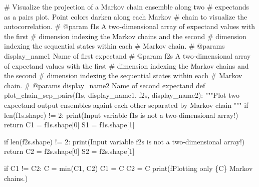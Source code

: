 \documentclass[
  letterpaper,
  DIV=11,
  numbers=noendperiod]{scrartcl}
\newenvironment{Shaded}{\begin{snugshade}}{\end{snugshade}}
\newcommand{\BuiltInTok}[1]{\textcolor[rgb]{0.00,0.23,0.31}{#1}}
\newcommand{\CommentTok}[1]{\textcolor[rgb]{0.37,0.37,0.37}{#1}}
\newcommand{\ControlFlowTok}[1]{\textcolor[rgb]{0.00,0.23,0.31}{#1}}
\newcommand{\DecValTok}[1]{\textcolor[rgb]{0.68,0.00,0.00}{#1}}
\newcommand{\KeywordTok}[1]{\textcolor[rgb]{0.00,0.23,0.31}{#1}}
\newcommand{\NormalTok}[1]{\textcolor[rgb]{0.00,0.23,0.31}{#1}}
\newcommand{\OperatorTok}[1]{\textcolor[rgb]{0.37,0.37,0.37}{#1}}
\newcommand{\SpecialCharTok}[1]{\textcolor[rgb]{0.37,0.37,0.37}{#1}}
\newcommand{\SpecialStringTok}[1]{\textcolor[rgb]{0.13,0.47,0.30}{#1}}
\newcommand{\StringTok}[1]{\textcolor[rgb]{0.13,0.47,0.30}{#1}}
\begin{document}
\begin{Shaded}
\begin{Highlighting}[]
\CommentTok{\# Visualize the projection of a Markov chain ensemble along two }
\CommentTok{\# expectands as a pairs plot.  Point colors darken along each Markov }
\CommentTok{\# chain to visualize the autocorrelation.}
\CommentTok{\# @param f1s A two{-}dimensional array of expectand values with the first }
\CommentTok{\#            dimension indexing the Markov chains and the second }
\CommentTok{\#            dimension indexing the sequential states  within each }
\CommentTok{\#            Markov chain.}
\CommentTok{\# @params display\_name1 Name of first expectand}
\CommentTok{\# @param f2s A two{-}dimensional array of expectand values with the first }
\CommentTok{\#            dimension indexing the Markov chains and the second }
\CommentTok{\#            dimension indexing the sequential states  within each }
\CommentTok{\#            Markov chain.}
\CommentTok{\# @params display\_name2 Name of second expectand}
\KeywordTok{def}\NormalTok{ plot\_chain\_sep\_pairs(f1s, display\_name1,}
\NormalTok{                         f2s, display\_name2):}
  \CommentTok{"""Plot two expectand output ensembles againt each other separated by}
\CommentTok{     Markov chain """}
  \ControlFlowTok{if} \BuiltInTok{len}\NormalTok{(f1s.shape) }\OperatorTok{!=} \DecValTok{2}\NormalTok{:}
    \BuiltInTok{print}\NormalTok{(}\StringTok{\textquotesingle{}Input variable \textasciigrave{}f1s\textasciigrave{} is not a two{-}dimensional array!\textquotesingle{}}\NormalTok{)}
    \ControlFlowTok{return}
\NormalTok{  C1 }\OperatorTok{=}\NormalTok{ f1s.shape[}\DecValTok{0}\NormalTok{]}
\NormalTok{  S1 }\OperatorTok{=}\NormalTok{ f1s.shape[}\DecValTok{1}\NormalTok{]}
  
  \ControlFlowTok{if} \BuiltInTok{len}\NormalTok{(f2s.shape) }\OperatorTok{!=} \DecValTok{2}\NormalTok{:}
    \BuiltInTok{print}\NormalTok{(}\StringTok{\textquotesingle{}Input variable \textasciigrave{}f2s\textasciigrave{} is not a two{-}dimensional array!\textquotesingle{}}\NormalTok{)}
    \ControlFlowTok{return}
\NormalTok{  C2 }\OperatorTok{=}\NormalTok{ f2s.shape[}\DecValTok{0}\NormalTok{]}
\NormalTok{  S2 }\OperatorTok{=}\NormalTok{ f2s.shape[}\DecValTok{1}\NormalTok{]}
    
  \ControlFlowTok{if}\NormalTok{ C1 }\OperatorTok{!=}\NormalTok{ C2:}
\NormalTok{    C }\OperatorTok{=} \BuiltInTok{min}\NormalTok{(C1, C2)}
\NormalTok{    C1 }\OperatorTok{=}\NormalTok{ C}
\NormalTok{    C2 }\OperatorTok{=}\NormalTok{ C}
    \BuiltInTok{print}\NormalTok{(}\SpecialStringTok{f\textquotesingle{}Plotting only }\SpecialCharTok{\{}\NormalTok{C}\SpecialCharTok{\}}\SpecialStringTok{ Markov chains.\textquotesingle{}}\NormalTok{)}
  

\end{Highlighting}
\end{Shaded}
\end{document}
